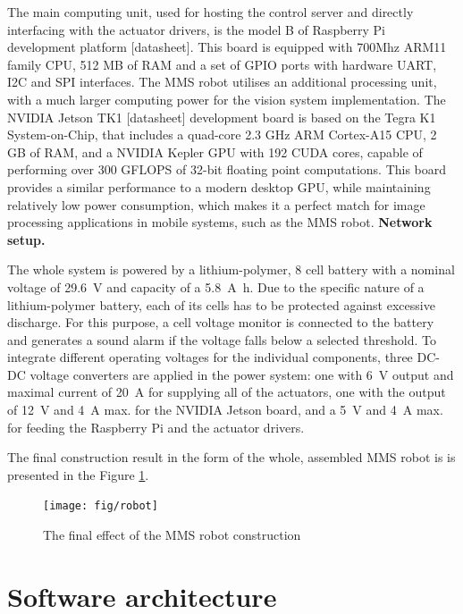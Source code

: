 The main computing unit, used for hosting the control server and directly interfacing with the actuator drivers, is the model B of Raspberry Pi development platform [datasheet]. This board is equipped with 700Mhz ARM11 family CPU, 512 MB of RAM and a set of GPIO ports with hardware UART, I2C and SPI interfaces. The MMS robot utilises an additional processing unit, with a much larger computing power for the vision system implementation. The NVIDIA Jetson TK1 [datasheet] development board is based on the Tegra K1 System-on-Chip, that includes a quad-core 2.3 GHz ARM Cortex-A15 CPU, 2 GB of RAM, and a NVIDIA Kepler GPU with 192 CUDA cores, capable of performing over 300 GFLOPS of 32-bit floating point computations. This board provides a similar performance to a modern desktop GPU, while maintaining relatively low power consumption, which makes it a perfect match for image processing applications in mobile systems, such as the MMS robot. \textbf{Network setup.}

The whole system is powered by a lithium-polymer, 8 cell battery with a nominal voltage of \SI{29.6}{\volt} and capacity of a \SI{5.8}{\ampere\hour}. Due to the specific nature of a lithium-polymer battery, each of its cells has to be protected against excessive discharge. For this purpose, a cell voltage monitor is connected to the battery and generates a sound alarm if the voltage falls below a selected threshold. To integrate different operating voltages for the individual components, three DC-DC voltage converters are applied in the power system: one with \SI{6}{\volt} output and maximal current of \SI{20}{\ampere} for supplying all of the actuators, one with the output of \SI{12}{\volt} and \SI{4}{\ampere} max. for the NVIDIA Jetson board, and a \SI{5}{\volt} and \SI{4}{\ampere} max. for feeding the Raspberry Pi and the actuator drivers.

The final construction result in the form of the whole, assembled MMS robot is  is presented in the Figure \ref{fig:assembled}.

\begin{figure}[H]
\centering
\texttt{[image: fig/robot]}
\caption{The final effect of the MMS robot construction}
\label{fig:assembled}
\end{figure}

\section{Software architecture}
\label{sec:soft}

